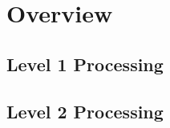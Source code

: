 \chapter{Overview}
\label{chapter:overview}
\pagestyle{localfancy}

\section{Level 1 Processing}

\section{Level 2 Processing}




